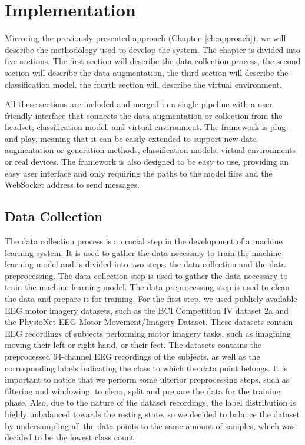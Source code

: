 \chapter{Implementation}\label{ch:methodology}
Mirroring the previously presented approach (Chapter~\ref{ch:approach}), we will describe the methodology used to develop the system.
The chapter is divided into five sections.
The first section will describe the data collection process, the second section will describe the data augmentation, the third section will describe the classification model, the fourth section will describe the virtual environment.

All these sections are included and merged in a single pipeline with a user friendly interface that connects the data augmentation or collection from the headset, classification model, and virtual environment.
The framework is plug-and-play, meaning that it can be easily extended to support new data augmentation or generation methods, classification models, virtual environments or real devices.
The framework is also designed to be easy to use, providing an easy user interface and only requiring the paths to the model files and the WebSocket address to send messages.


\section{Data Collection}
The data collection process is a crucial step in the development of a machine learning system.
It is used to gather the data necessary to train the machine learning model and is divided into two steps: the data collection and the data preprocessing.
The data collection step is used to gather the data necessary to train the machine learning model.
The data preprocessing step is used to clean the data and prepare it for training.
For the first step, we used publicly available EEG motor imagery datasets, such as the BCI Competition IV dataset 2a and the PhysioNet EEG Motor Movement/Imagery Dataset.
These datasets contain EEG recordings of subjects performing motor imagery tasks, such as imagining moving their left or right hand, or their feet.
The datasets contains the preprocessed 64-channel EEG recordings of the subjects, as well as the corresponding labels indicating the class to which the data point belongs.
It is important to notice that we perform some ulterior preprocessing steps, such as filtering and windowing, to clean, split and prepare the data for the training phase.
Also, due to the nature of the dataset recordings, the label distribution is highly unbalanced towards the resting state, so we decided to balance the dataset by undersampling all the data points to the same amount of samples, which was decided to be the lowest class count.
